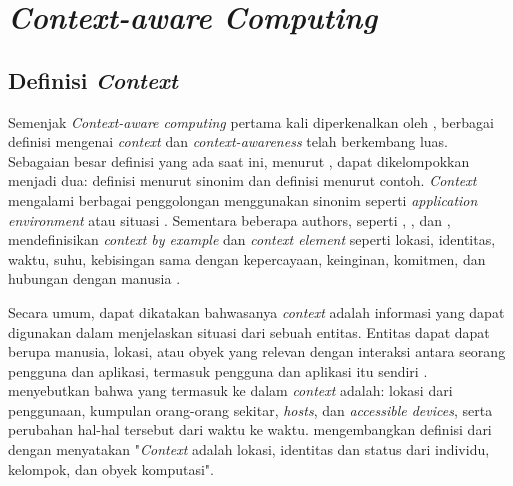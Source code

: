 \section{\textit{Context-aware Computing}}
\label{sec:context-aware-computing}


\subsection{Definisi \textit{Context}}
\label{ssec:context-definition}
Semenjak \textit{Context-aware computing} pertama kali diperkenalkan oleh \citep{schilit_context-aware_1994}, berbagai definisi mengenai \textit{context} dan \textit{context-awareness} telah berkembang luas. Sebagaian besar definisi yang ada saat ini, menurut \citep{zimmermann_operational_2007}, dapat dikelompokkan menjadi dua: definisi menurut sinonim dan definisi menurut contoh. \textit{Context} mengalami berbagai penggolongan menggunakan sinonim seperti \textit{application environment} \citep{hull_towards_1997} atau situasi \citep{brown_stick-e_1995}. Sementara beberapa authors, seperti \citep{brown_context-aware_1997}, \citep{gross_awareness_2001}, dan \citep{ryan_enhanced_1999}, mendefinisikan \textit{context by example} dan \textit{context element} seperti lokasi, identitas, waktu, suhu, kebisingan sama dengan kepercayaan, keinginan, komitmen, dan hubungan dengan manusia \citep{chen_intelligent_2003}.


Secara umum, dapat dikatakan bahwasanya \textit{context} adalah informasi yang dapat digunakan dalam menjelaskan situasi dari sebuah entitas. Entitas dapat dapat berupa manusia, lokasi, atau obyek yang relevan dengan interaksi antara seorang pengguna dan aplikasi, termasuk pengguna dan aplikasi itu sendiri \citep{dey_understanding_2001}. \citep{schilit_context-aware_1994} menyebutkan bahwa yang termasuk ke dalam \textit{context} adalah: lokasi dari penggunaan, kumpulan orang-orang sekitar, \textit{hosts}, dan \textit{accessible devices}, serta perubahan hal-hal tersebut dari waktu ke waktu. \citep{dey_understanding_2001} mengembangkan definisi dari \citep{schilit_context-aware_1994} dengan menyatakan "\textit{Context} adalah lokasi, identitas dan status dari individu, kelompok, dan obyek komputasi".


